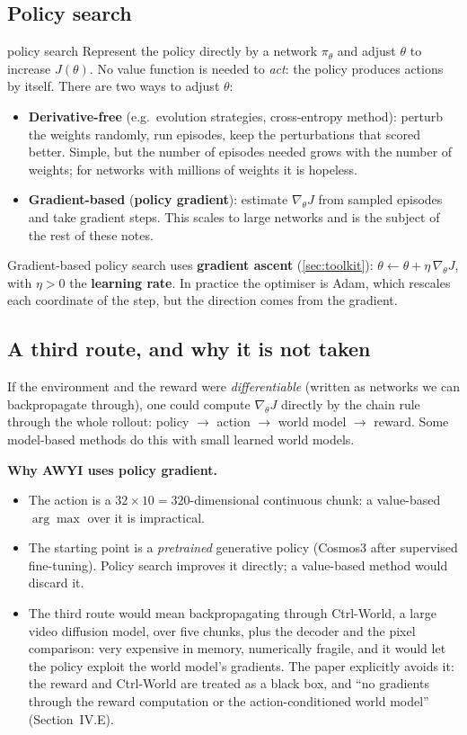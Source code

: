 \documentclass[11pt,a4paper]{article}
\begin{document}
\subsection{Policy search}
\begin{newc}{policy search}
Represent the policy directly by a network $\pi_\theta$ and adjust $\theta$ to increase $J(\theta)$. No value function is needed to \emph{act}: the policy produces actions by itself. There are two ways to adjust $\theta$:
\begin{itemize}[leftmargin=*]
\item \textbf{Derivative-free} (e.g.\ evolution strategies, cross-entropy method): perturb the weights randomly, run episodes, keep the perturbations that scored better. Simple, but the number of episodes needed grows with the number of weights; for networks with millions of weights it is hopeless.
\item \textbf{Gradient-based} (\textbf{policy gradient}): estimate $\nabla_\theta J$ from sampled episodes and take gradient steps. This scales to large networks and is the subject of the rest of these notes.
\end{itemize}
\end{newc}

Gradient-based policy search uses \textbf{gradient ascent} (\cref{sec:toolkit}): $\theta\leftarrow\theta+\eta\,\nabla_\theta J$, with $\eta>0$ the \textbf{learning rate}. In practice the optimiser is Adam, which rescales each coordinate of the step, but the direction comes from the gradient.

\subsection{A third route, and why it is not taken}
If the environment and the reward were \emph{differentiable} (written as networks we can backpropagate through), one could compute $\nabla_\theta J$ directly by the chain rule through the whole rollout: policy $\to$ action $\to$ world model $\to$ reward. Some model-based methods do this with small learned world models.
\begin{paperlink}
\textbf{Why AWYI uses policy gradient.}
\begin{itemize}[leftmargin=*]
\item The action is a $32\times10=320$-dimensional continuous chunk: a value-based $\arg\max$ over it is impractical.
\item The starting point is a \emph{pretrained} generative policy (Cosmos3 after supervised fine-tuning). Policy search improves it directly; a value-based method would discard it.
\item The third route would mean backpropagating through Ctrl-World, a large video diffusion model, over five chunks, plus the decoder and the pixel comparison: very expensive in memory, numerically fragile, and it would let the policy exploit the world model's gradients. The paper explicitly avoids it: the reward and Ctrl-World are treated as a black box, and ``no gradients through the reward computation or the action-conditioned world model'' (Section~IV.E).
\end{itemize}
\end{paperlink}
\end{document}
